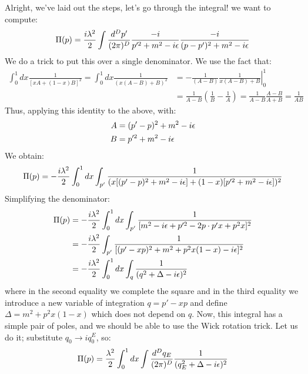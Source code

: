 Alright, we've laid out the steps, let's go through the integral! we want to compute:
\begin{equation}
    \Pi(p) = \frac{i\lambda^2}{2}\int \frac{d^Dp'}{(2\pi)^D}\frac{-i}{p'^2 + m^2 - i\epsilon}\frac{-i}{(p - p')^2 + m^2 - i\epsilon}
\end{equation}
We do a trick to put this over a single denominator. We use the fact that:
\begin{equation}
    \begin{split}
        \int_0^1 dx \frac{1}{[xA + (1-x)B]^2} = \int_0^1 dx \frac{1}{(x(A - B) + B)^2} &=\left.-\frac{1}{(A-B)}\frac{1}{x(A - B) + B}\right|_0^1 
        \\ &= \frac{1}{A-B}\left(\frac{1}{B} - \frac{1}{A}\right) = \frac{1}{A-B}\frac{A-B}{A+B} = \frac{1}{AB}
    \end{split}
\end{equation}
Thus, applying this identity to the above, with:
\begin{equation}
    \begin{split}
        A &= (p' - p)^2 + m^2 - i\epsilon
        \\ B &= p'^2 + m^2 - i\epsilon
    \end{split}
\end{equation}
We obtain:
\begin{equation}
    \Pi(p) = -\frac{i\lambda^2}{2}\int_0^1 dx\int_{p'}\frac{1}{(x[(p' - p)^2 + m^2 - i\epsilon] + (1-x)[p'^2 + m^2 - i\epsilon])^2}
\end{equation}
Simplifying the denominator:
\begin{equation}
    \begin{split}
        \Pi(p) &= -\frac{i\lambda^2}{2}\int_0^1 dx\int_{p'} \frac{1}{[m^2 - i\epsilon + p'^2 - 2p\cdot p'x + p^2x]^2} 
        \\ &= -\frac{i\lambda^2}{2}\int_{p'} \frac{1}{[(p' - xp)^2 + m^2 + p^2x(1-x) - i\epsilon]^2}
        \\ &= -\frac{i\lambda^2}{2}\int_0^1 dx \int_q \frac{1}{(q^2 + \Delta - i\epsilon)^2}
    \end{split}
\end{equation}
where in the second equality we complete the square and in the third equality we introduce a new variable of integration $q = p' - xp$ and define $\Delta = m^2 + p^2x(1-x)$ which does not depend on $q$. Now, this integral has a simple pair of poles, and we should be able to use the Wick rotation trick. Let us do it; substitute $q_0 \to iq_0^E$, so:
\begin{equation}
    \Pi(p) = \frac{\lambda^2}{2}\int_0^1 dx \int \frac{d^Dq_E}{(2\pi)^D} \frac{1}{(q_E^2 + \Delta - i\epsilon)^2}
\end{equation}
